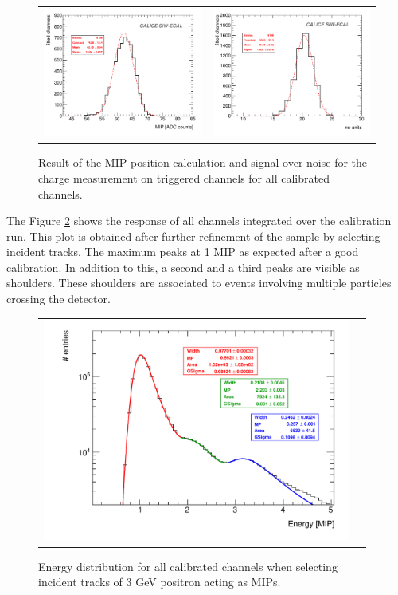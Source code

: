 \documentclass[a4paper,11pt]{article}
\begin{document}
\begin{figure}[!t]
  \centering
  \begin{tabular}{ll}
      \includegraphics[width=2.8in]{MIP_summary-eps-converted-to.pdf} & \includegraphics[width=2.8in]{SN_summary-eps-converted-to.pdf}  
  \end{tabular}
\caption{Result of the MIP position calculation and signal over noise for the charge measurement on triggered channels for all calibrated channels.}
\label{mipandSN}
\end{figure}

The Figure \ref{mip3peaks} shows the response of all channels integrated over the calibration run.
This plot is obtained after further refinement of the sample by selecting incident tracks.
The maximum peaks at 1 MIP as expected after a good calibration.
In addition to this, a second and a third peaks
are visible as shoulders. These shoulders are associated to 
events involving multiple 
particles crossing the detector.

\begin{figure}[!t]
  \centering 
    \begin{tabular}{ll}
      \includegraphics[width=4in]{MIP3peaks-eps-converted-to.pdf} 
    \end{tabular}
    \caption{Energy distribution for all calibrated channels when selecting incident tracks of 3 GeV positron acting as MIPs.}
\label{mip3peaks}
\end{figure}
\end{document}
